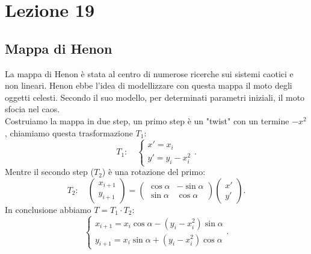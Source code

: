 \section{Lezione 19}%
\label{sub:Lezione 19}
\subsection{Mappa di Henon}%
\label{sub:Mappa di Henon}
La mappa di Henon è stata al centro di numerose ricerche sui sistemi caotici e non lineari. Henon ebbe l'idea di modellizzare con questa mappa il moto degli oggetti celesti. Secondo il suo modello, per determinati parametri iniziali, il moto sfocia nel caos.\\
Costruiamo la mappa in due step, un primo step è un "twist" con un termine $-x^2$, chiamiamo questa trasformazione $T_1$:
\[
    T_1: \quad
    \begin{cases}
        x' = x_i\\
	y' = y_i-x_i^2
    \end{cases}
.\] 
Mentre il secondo step ($T_2$) è una rotazione del primo:
\[
    T_2: \quad
    \begin{pmatrix} x_{i+1} \\ y_{i+1} \end{pmatrix} =
    \begin{pmatrix} 
	\cos\alpha  &  - \sin\alpha  \\
	\sin\alpha  &  \cos\alpha
    \end{pmatrix} 
    \begin{pmatrix} x' \\ y' \end{pmatrix} 
.\] 
In conclusione abbiamo $T = T_1\cdot T_2$:
\[
    \begin{cases}
	x_{i+1} = x_i\cos\alpha-(y_i-x_i^2)\sin\alpha\\
	y_{i+1} = x_i\sin\alpha + (y_i-x_i^2)\cos\alpha
    \end{cases}
.\] 
